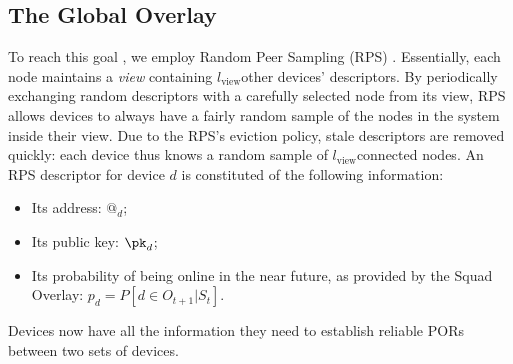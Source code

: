\subsection{The Global Overlay}
\label{sec:global_overlay}

\newcommand{\viewsize}{\ensuremath{l_{\text{view}}}}

To reach this goal , we employ Random Peer Sampling (RPS) \cite{Voulgaris_Gavidia_van_Steen_2005,Jelasity_Voulgaris_Guerraoui_Kermarrec_van_Steen_2007}.
Essentially, each node maintains a \emph{view} containing \viewsize other devices' descriptors. 
By periodically exchanging random descriptors with a carefully selected node from its view, RPS allows devices to always have a fairly random sample of the nodes in the system inside their view.
Due to the RPS's eviction policy, stale descriptors are removed quickly: each device thus knows a random sample of \viewsize connected nodes.
An RPS descriptor for device $d$ is constituted of the following information:
\begin{itemize}
  \item Its address: $@_d$;
  \item Its public key: \(\pk_d\);
  \item Its probability of being online in the near future, as provided by the Squad Overlay: $p_d=P\left[d \in O_{t+1} | S_t\right]$.
\end{itemize}

Devices now have all the information they need to establish reliable PORs between two sets of devices.




